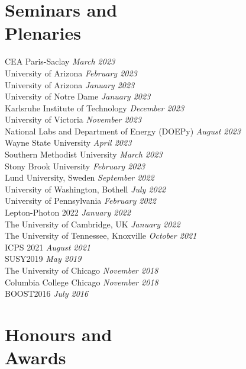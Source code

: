 \documentclass[margin,line]{resume}
\let\origsection\section%
\let\section\subsection%
\let\section\origsection%
\begin{document}
\begin{resume}
\section{\mysidestyle Seminars and\\Plenaries}
CEA Paris-Saclay \hfill \textsl{March 2023}\\
University of Arizona \hfill \textsl{February 2023}\\
University of Arizona \hfill \textsl{January 2023}\\
University of Notre Dame \hfill \textsl{January 2023}\\
Karlsruhe Institute of Technology \hfill \textsl{December 2023}\\
University of Victoria \hfill \textsl{November 2023}\\
National Labs and Department of Energy (DOEPy) \hfill \textsl{August 2023}\\
Wayne State University \hfill \textsl{April 2023}\\
Southern Methodist University \hfill \textsl{March 2023}\\
Stony Brook University \hfill \textsl{February 2023}\\
Lund University, Sweden \hfill \textsl{September 2022}\\
University of Washington, Bothell \hfill \textsl{July 2022}\\
University of Pennsylvania \hfill \textsl{February 2022}\\
Lepton-Photon 2022 \hfill \textsl{January 2022}\\
The University of Cambridge, UK \hfill \textsl{January 2022}\\
The University of Tennessee, Knoxville \hfill \textsl{October 2021}\\
ICPS 2021 \hfill \textsl{August 2021}\\
SUSY2019 \hfill \textsl{May 2019}\\
The University of Chicago \hfill \textsl{November 2018}\\
Columbia College Chicago \hfill \textsl{November 2018}\\
BOOST2016 \hfill \textsl{July 2016}


\section{\mysidestyle Honours and\\Awards}


\end{resume}
\end{document}
